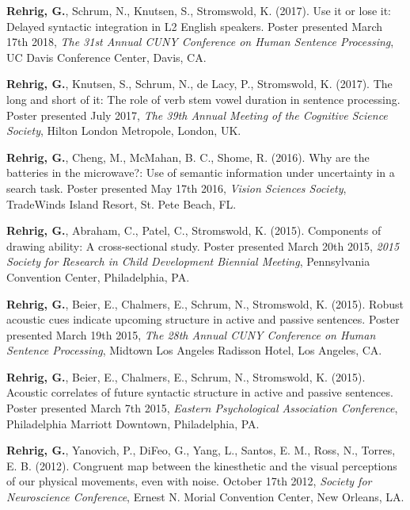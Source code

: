 \textbf{Rehrig, G.}, Schrum, N., Knutsen, S., Stromswold, K. (2017). Use it or lose it: Delayed syntactic integration in L2 English speakers. Poster presented March 17th 2018, \textit{The 31st Annual CUNY Conference on Human Sentence Processing}, UC Davis Conference Center, Davis, CA.



\textbf{Rehrig, G.}, Knutsen, S., Schrum, N., de Lacy, P., Stromswold, K. (2017). The long and short of it: The role of verb stem vowel duration in sentence processing. Poster presented July  2017, \textit{The 39th Annual Meeting of the Cognitive Science Society}, Hilton London Metropole, London, UK.



\textbf{Rehrig, G.}, Cheng, M., McMahan, B. C., Shome, R. (2016). Why are the batteries in the microwave?: Use of semantic information under uncertainty in a search task. Poster presented May 17th 2016, \textit{Vision Sciences Society}, TradeWinds Island Resort, St. Pete Beach, FL.



\textbf{Rehrig, G.}, Abraham, C., Patel, C., Stromswold, K. (2015). Components of drawing ability: A cross-sectional study. Poster presented March 20th 2015, \textit{2015 Society for Research in Child Development Biennial Meeting}, Pennsylvania Convention Center, Philadelphia, PA.



\textbf{Rehrig, G.}, Beier, E., Chalmers, E., Schrum, N., Stromswold, K. (2015). Robust acoustic cues indicate upcoming structure in active and passive sentences. Poster presented March 19th 2015, \textit{The 28th Annual CUNY Conference on Human Sentence Processing}, Midtown Los Angeles Radisson Hotel, Los Angeles, CA.



\textbf{Rehrig, G.}, Beier, E., Chalmers, E., Schrum, N., Stromswold, K. (2015). Acoustic correlates of future syntactic structure in active and passive sentences. Poster presented March 7th 2015, \textit{Eastern Psychological Association Conference}, Philadelphia Marriott Downtown, Philadelphia, PA.



\textbf{Rehrig, G.}, Yanovich, P., DiFeo, G., Yang, L., Santos, E. M., Ross, N., Torres, E. B. (2012). Congruent map between the kinesthetic and the visual perceptions of our physical movements, even with noise. October 17th 2012, \textit{Society for Neuroscience Conference}, Ernest N. Morial Convention Center, New Orleans, LA.



